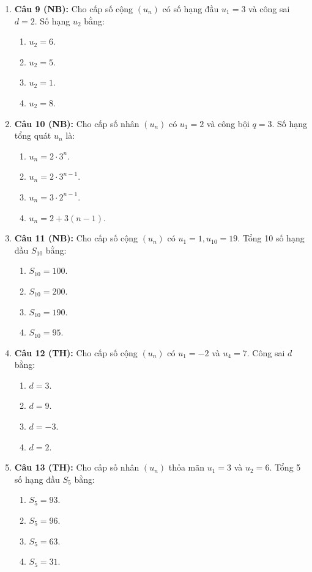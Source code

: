 \documentclass[12pt, a4paper]{article}
\begin{document}
\begin{enumerate}[leftmargin=0.8cm]
    \item \textbf{Câu 9 (NB):} Cho cấp số cộng $(u_n)$ có số hạng đầu $u_1 = 3$ và công sai $d = 2$. Số hạng $u_2$ bằng:
    \begin{enumerate}[label=\Alph*., leftmargin=0.8cm]
        \item $u_2 = 6$.
        \item $u_2 = 5$.
        \item $u_2 = 1$.
        \item $u_2 = 8$.
    \end{enumerate}

    \item \textbf{Câu 10 (NB):} Cho cấp số nhân $(u_n)$ có $u_1 = 2$ và công bội $q = 3$. Số hạng tổng quát $u_n$ là:
    \begin{enumerate}[label=\Alph*., leftmargin=0.8cm]
        \item $u_n = 2 \cdot 3^n$.
        \item $u_n = 2 \cdot 3^{n-1}$.
        \item $u_n = 3 \cdot 2^{n-1}$.
        \item $u_n = 2 + 3(n-1)$.
    \end{enumerate}

    \item \textbf{Câu 11 (NB):} Cho cấp số cộng $(u_n)$ có $u_1 = 1, u_{10} = 19$. Tổng 10 số hạng đầu $S_{10}$ bằng:
    \begin{enumerate}[label=\Alph*., leftmargin=0.8cm]
        \item $S_{10} = 100$.
        \item $S_{10} = 200$.
        \item $S_{10} = 190$.
        \item $S_{10} = 95$.
    \end{enumerate}

    \item \textbf{Câu 12 (TH):} Cho cấp số cộng $(u_n)$ có $u_1 = -2$ và $u_4 = 7$. Công sai $d$ bằng:
    \begin{enumerate}[label=\Alph*., leftmargin=0.8cm]
        \item $d = 3$.
        \item $d = 9$.
        \item $d = -3$.
        \item $d = 2$.
    \end{enumerate}

    \item \textbf{Câu 13 (TH):} Cho cấp số nhân $(u_n)$ thỏa mãn $u_1 = 3$ và $u_2 = 6$. Tổng 5 số hạng đầu $S_5$ bằng:
    \begin{enumerate}[label=\Alph*., leftmargin=0.8cm]
        \item $S_5 = 93$.
        \item $S_5 = 96$.
        \item $S_5 = 63$.
        \item $S_5 = 31$.
    \end{enumerate}


\end{enumerate}
\end{document}
